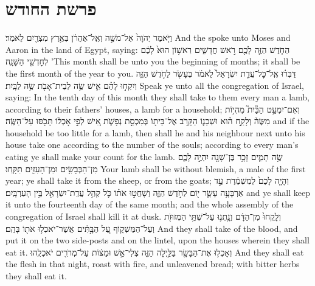 \documentclass[11pt, openany]{book}
\begin{document}
\section*{פרשת החודש}
\renewcommand{\haftarahname}{מפטיר לפרשת החודש}
\label{maft_hachodesh}
\setcounter{chap}{12}
\setcounter{verse}{1}
{וַיֹּ֤אמֶר יְהֹוָה֙ אֶל־מֹשֶׁ֣ה וְאֶֽל־אַהֲרֹ֔ן בְּאֶ֥רֶץ מִצְרַ֖יִם לֵאמֹֽר׃}
{And the \lord\space spoke unto Moses and Aaron in the land of Egypt, saying:}
{הַחֹ֧דֶשׁ הַזֶּ֛ה לָכֶ֖ם רֹ֣אשׁ חֳדָשִׁ֑ים רִאשׁ֥וֹן הוּא֙ לָכֶ֔ם לְחׇדְשֵׁ֖י הַשָּׁנָֽה׃}
{’This month shall be unto you the beginning of months; it shall be the first month of the year to you.}
{דַּבְּר֗וּ אֶֽל־כׇּל־עֲדַ֤ת יִשְׂרָאֵל֙ לֵאמֹ֔ר בֶּעָשֹׂ֖ר לַחֹ֣דֶשׁ הַזֶּ֑ה וְיִקְח֣וּ לָהֶ֗ם אִ֛ישׁ שֶׂ֥ה לְבֵית־אָבֹ֖ת שֶׂ֥ה לַבָּֽיִת׃}
{Speak ye unto all the congregation of Israel, saying: In the tenth day of this month they shall take to them every man a lamb, according to their fathers’ houses, a lamb for a household;}
{וְאִם־יִמְעַ֣ט הַבַּ֘יִת֮ מִהְי֣וֹת מִשֶּׂה֒ וְלָקַ֣ח ה֗וּא וּשְׁכֵנ֛וֹ הַקָּרֹ֥ב אֶל־בֵּית֖וֹ בְּמִכְסַ֣ת נְפָשֹׁ֑ת אִ֚ישׁ לְפִ֣י אׇכְל֔וֹ תָּכֹ֖סּוּ עַל־הַשֶּֽׂה׃}
{and if the household be too little for a lamb, then shall he and his neighbour next unto his house take one according to the number of the souls; according to every man’s eating ye shall make your count for the lamb.}
{שֶׂ֥ה תָמִ֛ים זָכָ֥ר בֶּן־שָׁנָ֖ה יִהְיֶ֣ה לָכֶ֑ם מִן־הַכְּבָשִׂ֥ים וּמִן־הָעִזִּ֖ים תִּקָּֽחוּ׃}
{Your lamb shall be without blemish, a male of the first year; ye shall take it from the sheep, or from the goats;}
{וְהָיָ֤ה לָכֶם֙ לְמִשְׁמֶ֔רֶת עַ֣ד אַרְבָּעָ֥ה עָשָׂ֛ר י֖וֹם לַחֹ֣דֶשׁ הַזֶּ֑ה וְשָׁחֲט֣וּ אֹת֗וֹ כֹּ֛ל קְהַ֥ל עֲדַֽת־יִשְׂרָאֵ֖ל בֵּ֥ין הָעַרְבָּֽיִם׃}
{and ye shall keep it unto the fourteenth day of the same month; and the whole assembly of the congregation of Israel shall kill it at dusk.}
{וְלָֽקְחוּ֙ מִן־הַדָּ֔ם וְנָ֥תְנ֛וּ עַל־שְׁתֵּ֥י הַמְּזוּזֹ֖ת וְעַל־הַמַּשְׁק֑וֹף עַ֚ל הַבָּ֣תִּ֔ים אֲשֶׁר־יֹאכְל֥וּ אֹת֖וֹ בָּהֶֽם׃}
{And they shall take of the blood, and put it on the two side-posts and on the lintel, upon the houses wherein they shall eat it.}
{וְאָכְל֥וּ אֶת־הַבָּשָׂ֖ר בַּלַּ֣יְלָה הַזֶּ֑ה צְלִי־אֵ֣שׁ וּמַצּ֔וֹת עַל־מְרֹרִ֖ים יֹאכְלֻֽהוּ׃}
{And they shall eat the flesh in that night, roast with fire, and unleavened bread; with bitter herbs they shall eat it.}
\end{document}
